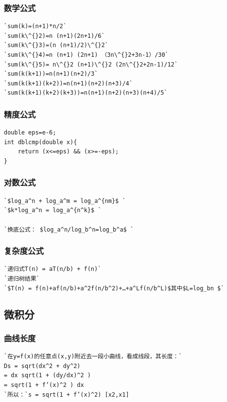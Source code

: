\documentclass[a4paper]{article}
\begin{document}
\begin{CJK*}{UTF8}{gbsn}
\begin{multicols}{3}
\begin{flushleft}
\subsubsection{数学公式}
\begin{lstlisting}
`sum(k)=(n+1)*n/2`
`sum(k\^{}2)=n (n+1)(2n+1)/6`
`sum(k\^{}3)=(n (n+1)/2)\^{}2`
`sum(k\^{}4)=n (n+1) (2n+1) （3n\^{}2+3n-1）/30`
`sum(k\^{}5)= n\^{}2 (n+1)\^{}2 (2n\^{}2+2n-1)/12`
`sum(k(k+1))=n(n+1)(n+2)/3`
`sum(k(k+1)(k+2))=n(n+1)(n+2)(n+3)/4`
`sum(k(k+1)(k+2)(k+3))=n(n+1)(n+2)(n+3)(n+4)/5`
\end{lstlisting}

\subsubsection{精度公式}
\begin{lstlisting}
double eps=e-6;
int dblcmp(double x){
	return (x<=eps) && (x>=-eps);
}
\end{lstlisting}

\subsubsection{对数公式}
\begin{lstlisting}
`$log_a^n + log_a^m = log_a^{nm}$ `
`$k*log_a^n = log_a^{n^k}$ `

`换底公式： $log_a^n/log_b^n=log_b^a$ `
\end{lstlisting}


\subsubsection{复杂度公式}
\begin{lstlisting}
`递归式T(n) = aT(n/b) + f(n)`
`递归树结果`
`$T(n) = f(n)+af(n/b)+a^2f(n/b^2)+…+a^Lf(n/b^L)$其中$L=log_bn $`
\end{lstlisting}

\subsection{微积分}

\subsubsection{曲线长度}
\begin{lstlisting}
`在y=f(x)的任意点(x,y)附近去一段小曲线，看成线段，其长度：`
Ds = sqrt(dx^2 + dy^2) 
= dx sqrt(1 + (dy/dx)^2 )
= sqrt(1 + f’(x)^2 ) dx
`所以：`s = sqrt(1 + f’(x)^2) [x2,x1]
\end{lstlisting}


\end{flushleft}
\end{multicols}
\end{CJK*}
\end{document}
